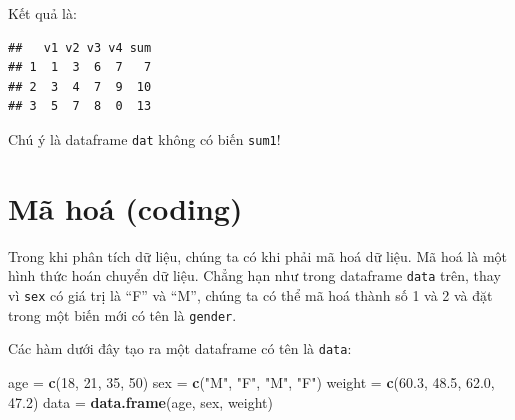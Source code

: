 \documentclass[
]{book}
\newenvironment{Shaded}{\begin{snugshade}}{\end{snugshade}}
\newcommand{\DecValTok}[1]{\textcolor[rgb]{0.00,0.00,0.81}{#1}}
\newcommand{\FloatTok}[1]{\textcolor[rgb]{0.00,0.00,0.81}{#1}}
\newcommand{\KeywordTok}[1]{\textcolor[rgb]{0.13,0.29,0.53}{\textbf{#1}}}
\newcommand{\NormalTok}[1]{#1}
\newcommand{\OperatorTok}[1]{\textcolor[rgb]{0.81,0.36,0.00}{\textbf{#1}}}
\newcommand{\StringTok}[1]{\textcolor[rgb]{0.31,0.60,0.02}{#1}}
\begin{document}
\begin{Shaded}
\end{Shaded}

Kết quả là:

\begin{verbatim}
##   v1 v2 v3 v4 sum
## 1  1  3  6  7   7
## 2  3  4  7  9  10
## 3  5  7  8  0  13
\end{verbatim}

Chú ý là dataframe \texttt{dat} không có biến \texttt{sum1}!

\hypertarget{muxe3-houxe1-coding}{%
\section{Mã hoá (coding)}\label{muxe3-houxe1-coding}}

Trong khi phân tích dữ liệu, chúng ta có khi phải mã hoá dữ liệu. Mã hoá là một hình thức hoán chuyển dữ liệu. Chẳng hạn như trong dataframe \texttt{data} trên, thay vì \texttt{sex} có giá trị là ``F'' và ``M'', chúng ta có thể mã hoá thành số 1 và 2 và đặt trong một biến mới có tên là \texttt{gender}.

Các hàm dưới đây tạo ra một dataframe có tên là \texttt{data}:

\begin{Shaded}
\begin{Highlighting}[]
\NormalTok{age =}\StringTok{ }\KeywordTok{c}\NormalTok{(}\DecValTok{18}\NormalTok{, }\DecValTok{21}\NormalTok{, }\DecValTok{35}\NormalTok{, }\DecValTok{50}\NormalTok{) }
\NormalTok{sex =}\StringTok{ }\KeywordTok{c}\NormalTok{(}\StringTok{"M"}\NormalTok{, }\StringTok{"F"}\NormalTok{, }\StringTok{"M"}\NormalTok{, }\StringTok{"F"}\NormalTok{)}
\NormalTok{weight =}\StringTok{ }\KeywordTok{c}\NormalTok{(}\FloatTok{60.3}\NormalTok{, }\FloatTok{48.5}\NormalTok{, }\FloatTok{62.0}\NormalTok{, }\FloatTok{47.2}\NormalTok{) }
\NormalTok{data =}\StringTok{ }\KeywordTok{data.frame}\NormalTok{(age, sex, weight) }
\end{Highlighting}
\end{Shaded}
\end{document}
